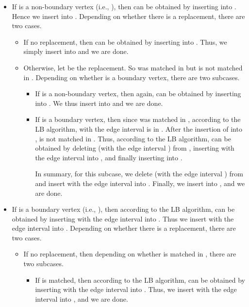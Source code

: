 \documentclass[11pt]{article}
\begin{document}
\begin{itemize}
\item
If  is a non-boundary vertex (i.e., ), then
 can be obtained by inserting  into . Hence we insert  into
. Depending on whether there is a replacement, there are two
cases.

\begin{itemize}
\item
If no replacement, then  can be obtained by inserting 
into . Thus, we simply insert  into  and we
are done.

\item
Otherwise, let  be the replacement. So  was matched in
 but is not matched in .
Depending on whether  is a boundary vertex, there are two
subcases.

\begin{itemize}
\item
If  is a non-boundary vertex, then again,  can be obtained
by inserting  into . We thus insert  into  and we
are done.


\item
If  is a boundary vertex, then
since  was matched in , according to the LB algorithm,
 with the edge interval  is in .
After the insertion of  into ,  is not matched in .
Thus, according to the LB algorithm,  can be obtained by
deleting  (with the edge interval ) from , inserting
 with the edge interval  into , and finally inserting  into .

In summary, for this subcase, we delete  (with the edge interval
) from  and insert
 with the edge interval  into .
Finally, we insert  into , and we are done.
\end{itemize}
\end{itemize}

\item
If  is a boundary vertex (i.e., ),
then according to the LB algorithm,  can be obtained by
inserting  with the edge interval  into .
Thus we insert  with the edge interval  into .
Depending on whether there is a replacement, there are two
cases.

\begin{itemize}
\item
If no replacement, then depending on whether  is matched in ,
there are two subcases.

\begin{itemize}
\item
If  is matched, then according to the LB algorithm,  can be
obtained by inserting  with the edge interval  into . Thus,
we insert  with the edge interval  into , and we are
done.


\end{itemize}
\end{itemize}
\end{itemize}
\end{document}
